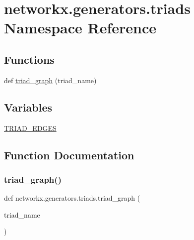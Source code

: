 \hypertarget{namespacenetworkx_1_1generators_1_1triads}{}\section{networkx.\+generators.\+triads Namespace Reference}
\label{namespacenetworkx_1_1generators_1_1triads}
\subsection*{Functions}
\begin{DoxyCompactItemize}
\item 
def \hyperlink{namespacenetworkx_1_1generators_1_1triads_aaac18c1833cd1977521e0fc2275687cf}{triad\+\_\+graph} (triad\+\_\+name)
\end{DoxyCompactItemize}
\subsection*{Variables}
\begin{DoxyCompactItemize}
\item 
\hyperlink{namespacenetworkx_1_1generators_1_1triads_a3bda613f5c344e00102577b8ba824a29}{T\+R\+I\+A\+D\+\_\+\+E\+D\+G\+ES}
\end{DoxyCompactItemize}


\subsection{Function Documentation}
\mbox{\label{namespacenetworkx_1_1generators_1_1triads_aaac18c1833cd1977521e0fc2275687cf}} 
\subsubsection{\texorpdfstring{triad\+\_\+graph()}{triad\_graph()}}
{\footnotesize\ttfamily def networkx.\+generators.\+triads.\+triad\+\_\+graph (\begin{DoxyParamCaption}\item[{}]{triad\+\_\+name }\end{DoxyParamCaption})}

